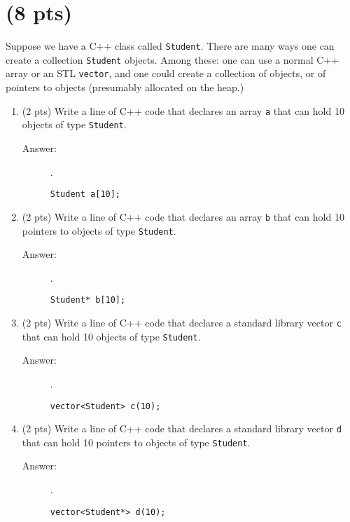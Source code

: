 \documentclass[11pt]{article}
\begin{document}
\section{(8 pts)}
\label{sec:org51d9e2c}
Suppose we have a C++ class called \texttt{Student}. There are many ways one can create a collection \texttt{Student} objects.  Among these: one can use a normal C++ array or an STL \texttt{vector}, and one could create a collection of objects, or of pointers to objects (presumably allocated on the heap.) 
\begin{enumerate}
\item (2 pts) Write a line of C++ code that declares an array \texttt{a} that can hold 10 objects of type \texttt{Student}.

\begin{description}
  \item[Answer:] .\\
  \begin{verbatim}
Student a[10];
  \end{verbatim}
\end{description}

\item (2 pts) Write a line of C++ code that declares an array \texttt{b} that can hold 10 pointers to objects of type \texttt{Student}.

\begin{description}
  \item[Answer:] .\\
  \begin{verbatim}
Student* b[10];
  \end{verbatim}
\end{description}

\item (2 pts) Write a line of C++ code that declares a standard library vector \texttt{c} that can hold 10 objects of type \texttt{Student}.

\begin{description}
  \item[Answer:] .\\
  \begin{verbatim}
vector<Student> c(10);
  \end{verbatim}
\end{description}

\item (2 pts) Write a line of C++ code that declares a standard library vector \texttt{d} that can hold 10 pointers to objects of type \texttt{Student}.

\begin{description}
  \item[Answer:] .\\
  \begin{verbatim}
vector<Student*> d(10);
  \end{verbatim}
\end{description}

\end{enumerate}
\end{document}
